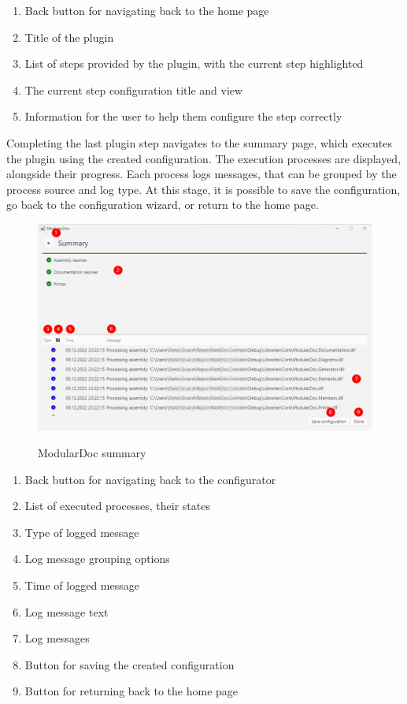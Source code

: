 \begin{enumerate}
    \item Back button for navigating back to the home page
    \item Title of the plugin
    \item List of steps provided by the plugin, with the current step highlighted
    \item The current step configuration title and view
    \item Information for the user to help them configure the step correctly
\end{enumerate}

\pagebreak
Completing the last plugin step navigates to the summary page, which executes the plugin using the created configuration. The execution processes are displayed, alongside their progress. Each process logs messages, that can be grouped by the process source and log type. At this stage, it is possible to save the configuration, go back to the configuration wizard, or return to the home page.

\begin{figure}[H]
    \includegraphics[width=\linewidth]{img/modularDocSummary.png}
    \label{fig:modularDocSummaryPage}
    \caption{ModularDoc summary}
\end{figure}

\begin{enumerate}
    \item Back button for navigating back to the configurator
    \item List of executed processes, their states
    \item Type of logged message
    \item Log message grouping options
    \item Time of logged message
    \item Log message text
    \item Log messages
    \item Button for saving the created configuration
    \item Button for returning back to the home page
\end{enumerate}

